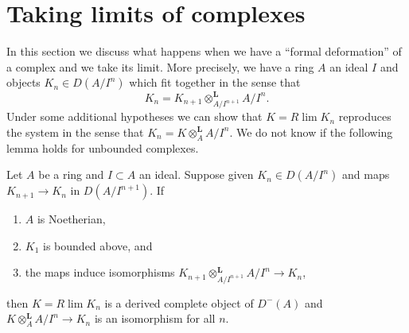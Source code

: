 \section{Taking limits of complexes}
\label{section-limits}

\noindent
In this section we discuss what happens when we have a ``formal deformation''
of a complex and we take its limit. More precisely, we have a ring $A$
an ideal $I$ and objects $K_n \in D(A/I^n)$ which fit together 
in the sense that
$$
K_n = K_{n + 1} \otimes_{A/I^{n + 1}}^\mathbf{L} A/I^n.
$$
Under some additional hypotheses we can show that $K = R\lim K_n$ reproduces
the system in the sense that $K_n = K \otimes_A^\mathbf{L} A/I^n$.
We do not know if the following lemma holds for unbounded complexes.

\begin{lemma}
\label{lemma-Rlim-gives-complete}
Let $A$ be a ring and $I \subset A$ an ideal. Suppose
given $K_n \in D(A/I^n)$ and maps $K_{n + 1} \to K_n$ in
$D(A/I^{n + 1})$. If
\begin{enumerate}
\item $A$ is Noetherian,
\item $K_1$ is bounded above, and
\item the maps induce isomorphisms
$K_{n + 1} \otimes_{A/I^{n + 1}}^\mathbf{L} A/I^n \to K_n$,
\end{enumerate}
then $K = R\lim K_n$ is a derived complete object of $D^-(A)$ and
$K \otimes_A^\mathbf{L} A/I^n \to K_n$ is an isomorphism for all $n$.
\end{lemma}

